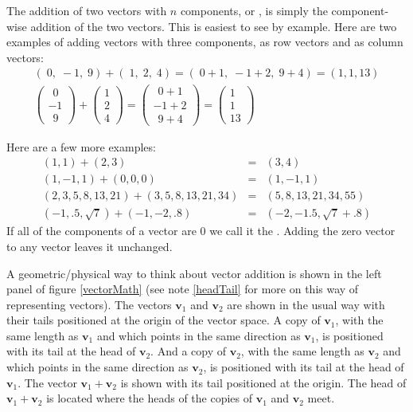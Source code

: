    The addition of two vectors with $n$ components, or , is simply the component-wise addition of the two vectors. This is 
easiest to see by example. Here are two examples of adding vectors with three 
components, as row vectors and as column vectors:
\begin{eqnarray*}
 (\; 0,\; -1,\; 9) + (\; 1,\; 2,\; 4) = (\; 0+1,\; -1+2,\; 9+4) = (1, 1, 13) \\
\begin{pmatrix}
~~0 \\ -1 \\ ~~9
\end{pmatrix}
+
\begin{pmatrix}
1 \\ 2   \\ 4
\end{pmatrix}
=
\begin{pmatrix}
~~0+1 \\ -1+2 \\ ~~9 +4
\end{pmatrix}
=
\begin{pmatrix}
1 \\ 1 \\ 13
\end{pmatrix} \qquad  \qquad  \qquad 
\end{eqnarray*}

Here are a few more examples:
\begin{eqnarray*}
(1,1) + (2,3) &=& (3,4)  \\
(1,-1,1) + (0,0,0) &=& (1,-1,1)  \\
(2,3,5,8,13,21) + (3,5,8,13,21,34) &=& (5,8,13,21,34,55) \\
(-1,.5,\sqrt{7}) + (-1,-2,.8) &=& (-2,-1.5,\sqrt{7}+.8)
\end{eqnarray*}
If all of the components of a vector are $0$ we call it the . Adding the zero vector to any vector leaves it unchanged.

   A geometric/physical way to think about vector addition is shown in the left 
panel of figure \ref{vectorMath} (see note \ref{headTail} for more on this way of representing vectors). The vectors $\mathbf{v}_1$ and 
$\mathbf{v}_2$ are shown in the usual way with their tails positioned at the 
origin of the vector space. A copy of $\mathbf{v}_1$, with the same length as 
$\mathbf{v}_1$ and which points in the same direction as $\mathbf{v}_1$, is 
positioned with its tail at the head of $\mathbf{v}_2$. And a copy of 
$\mathbf{v}_2$, with the same length as $\mathbf{v}_2$ and which points in the 
same direction as $\mathbf{v}_2$, is positioned with its tail at the head of 
$\mathbf{v}_1$. The vector $\mathbf{v}_1 + \mathbf{v}_2$ is shown with its 
tail positioned at the origin. The head of $\mathbf{v}_1 + \mathbf{v}_2$ is 
located where the heads of the copies of $\mathbf{v}_1$ and $\mathbf{v}_2$ 
meet. 

